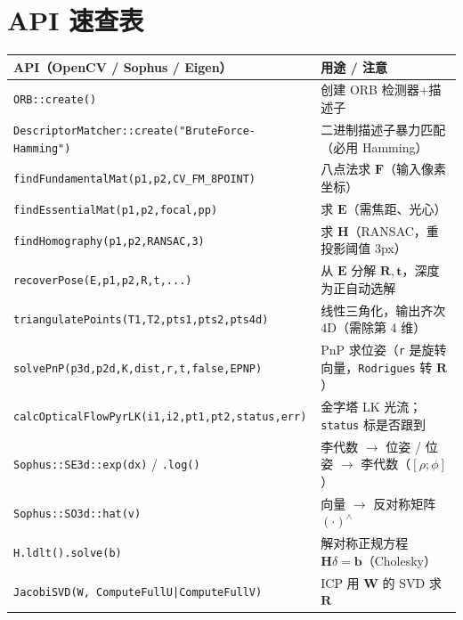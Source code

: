 \section*{API 速查表}
\begin{table}[H]\centering\small
\begin{tabular}{p{}p{}}
\toprule
API（OpenCV / Sophus / Eigen） & 用途 / 注意 \\
\midrule
\texttt{ORB::create()} & 创建 ORB 检测器+描述子 \\
\texttt{DescriptorMatcher::create("BruteForce-Hamming")} & 二进制描述子暴力匹配（必用 Hamming） \\
\texttt{findFundamentalMat(p1,p2,CV\_FM\_8POINT)} & 八点法求 $\mathbf{F}$（输入像素坐标） \\
\texttt{findEssentialMat(p1,p2,focal,pp)} & 求 $\mathbf{E}$（需焦距、光心） \\
\texttt{findHomography(p1,p2,RANSAC,3)} & 求 $\mathbf{H}$（RANSAC，重投影阈值 3px） \\
\texttt{recoverPose(E,p1,p2,R,t,...)} & 从 $\mathbf{E}$ 分解 $\mathbf{R},\mathbf{t}$，深度为正自动选解 \\
\texttt{triangulatePoints(T1,T2,pts1,pts2,pts4d)} & 线性三角化，输出齐次 4D（需除第 4 维） \\
\texttt{solvePnP(p3d,p2d,K,dist,r,t,false,EPNP)} & PnP 求位姿（\texttt{r} 是旋转向量，\texttt{Rodrigues} 转 $\mathbf{R}$） \\
\texttt{calcOpticalFlowPyrLK(i1,i2,pt1,pt2,status,err)} & 金字塔 LK 光流；\texttt{status} 标是否跟到 \\
\texttt{Sophus::SE3d::exp(dx)} / \texttt{.log()} & 李代数 $\to$ 位姿 / 位姿 $\to$ 李代数（$[\rho;\phi]$） \\
\texttt{Sophus::SO3d::hat(v)} & 向量 $\to$ 反对称矩阵 $(\cdot)^\wedge$ \\
\texttt{H.ldlt().solve(b)} & 解对称正规方程 $\mathbf{H}\delta=\mathbf{b}$（Cholesky） \\
\texttt{JacobiSVD(W, ComputeFullU|ComputeFullV)} & ICP 用 $\mathbf{W}$ 的 SVD 求 $\mathbf{R}$ \\
\bottomrule
\end{tabular}
\end{table}
